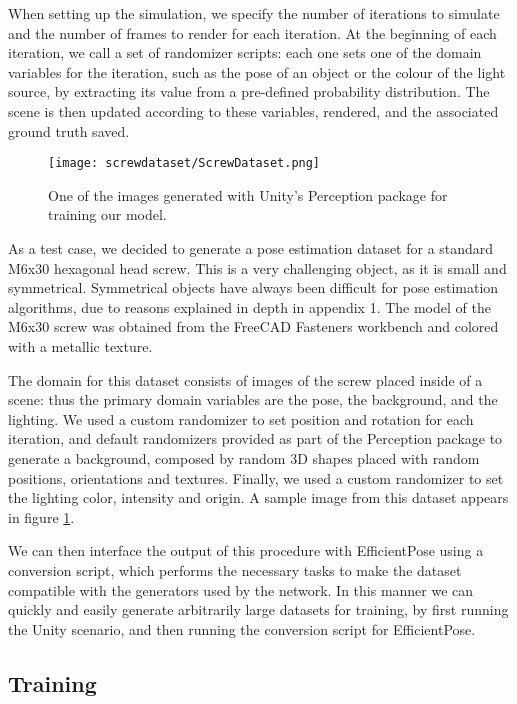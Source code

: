 When setting up the simulation, we specify the number of iterations to simulate and the number of frames to render for each iteration. At the beginning of each iteration, we call a set of randomizer scripts: each one sets one of the domain variables for the iteration, such as the pose of an object or the colour of the light source, by extracting its value from a pre-defined probability distribution. The scene is then updated according to these variables, rendered, and the associated ground truth saved.

\begin{figure}
    \centering
    \texttt{[image: screwdataset/ScrewDataset.png]}
    \caption{One of the images generated with Unity's Perception package for training our model.}
    \label{fig:screwdataset}
\end{figure}

As a test case, we decided to generate a pose estimation dataset for a standard M6x30 hexagonal head screw. This is a very challenging object, as it is small and symmetrical. Symmetrical objects have always been difficult for pose estimation algorithms, due to reasons explained in depth in appendix 1. The model of the M6x30 screw was obtained from the FreeCAD Fasteners workbench\cite{Fasteners} and colored with a metallic texture.

The domain for this dataset consists of images of the screw placed inside of a scene: thus the primary domain variables are the pose, the background, and the lighting. We used a custom randomizer to set position and rotation for each iteration, and default randomizers provided as part of the Perception package to generate a background, composed by random 3D shapes placed with random positions, orientations and textures. Finally, we used a custom randomizer to set the lighting color, intensity and origin. A sample image from this dataset appears in figure \ref{fig:screwdataset}.

We can then interface the output of this procedure with EfficientPose using a conversion script, which performs the necessary tasks to make the dataset compatible with the generators used by the network. In this manner we can quickly and easily generate arbitrarily large datasets for training, by first running the Unity scenario, and then running the conversion script for EfficientPose.

\subsection{Training}

